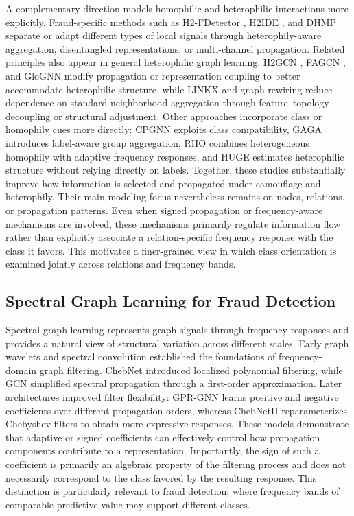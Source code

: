 \documentclass[10pt,journal]{IEEEtran}
\begin{document}
A complementary direction models homophilic and heterophilic interactions more explicitly. Fraud-specific methods such as H2-FDetector \cite{shi2022h2fdetector}, H2IDE \cite{fu2025h2ide}, and DHMP \cite{zhang2025dhmp} separate or adapt different types of local signals through heterophily-aware aggregation, disentangled representations, or multi-channel propagation. Related principles also appear in general heterophilic graph learning. H2GCN \cite{zhu2020h2gcn}, FAGCN \cite{bo2021fagcn}, and GloGNN \cite{li2022glognn} modify propagation or representation coupling to better accommodate heterophilic structure, while LINKX \cite{lim2021linkx} and graph rewiring \cite{bi2024rewiring} reduce dependence on standard neighborhood aggregation through feature--topology decoupling or structural adjustment. Other approaches incorporate class or homophily cues more directly: CPGNN \cite{zhu2021cpgnn} exploits class compatibility, GAGA \cite{wang2023gaga} introduces label-aware group aggregation, RHO \cite{ai2025rho} combines heterogeneous homophily with adaptive frequency responses, and HUGE \cite{pan2025huge} estimates heterophilic structure without relying directly on labels. Together, these studies substantially improve how information is selected and propagated under camouflage and heterophily. Their main modeling focus nevertheless remains on nodes, relations, or propagation patterns. Even when signed propagation or frequency-aware mechanisms are involved, these mechanisms primarily regulate information flow rather than explicitly associate a relation-specific frequency response with the class it favors. This motivates a finer-grained view in which class orientation is examined jointly across relations and frequency bands.

\subsection{Spectral Graph Learning for Fraud Detection}

Spectral graph learning \cite{shuman2013emerging,ortega2018gsp} represents graph signals through frequency responses and provides a natural view of structural variation across different scales. Early graph wavelets \cite{hammond2011wavelets} and spectral convolution \cite{bruna2014spectral} established the foundations of frequency-domain graph filtering. ChebNet \cite{defferrard2016chebnet} introduced localized polynomial filtering, while GCN \cite{kipf2017gcn} simplified spectral propagation through a first-order approximation. Later architectures improved filter flexibility: GPR-GNN \cite{chien2021gprgnn} learns positive and negative coefficients over different propagation orders, whereas ChebNetII \cite{he2022chebnetii} reparameterizes Chebyshev filters to obtain more expressive responses. These models demonstrate that adaptive or signed coefficients can effectively control how propagation components contribute to a representation. Importantly, the sign of such a coefficient is primarily an algebraic property of the filtering process and does not necessarily correspond to the class favored by the resulting response. This distinction is particularly relevant to fraud detection, where frequency bands of comparable predictive value may support different classes.
\end{document}
